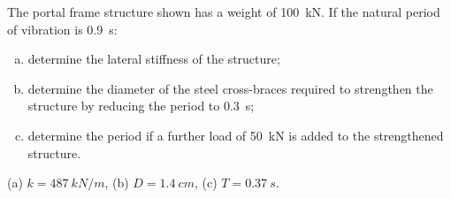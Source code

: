 
\begin{Exercise}[label={frames_modification}]
The portal frame structure shown has a weight of \SI{100}{kN}. If the natural period of vibration is \SI{0.9}{s}:
\begin{enumerate}[(a)]
    \item determine the lateral stiffness of the structure;
    \item determine the diameter of the steel cross-braces required to strengthen the structure by reducing the period to \SI{0.3}{s};
    \item determine the period if a further load of \SI{50}{kN} is added to the strengthened structure.
\end{enumerate}

\begin{center}
\end{center}

\shortAnswer (a) $k = \SI{487}{kN/m}$, (b) $D = \SI{1.4}{cm}$, (c) $T = \SI{0.37}{s}$.
\end{Exercise}




